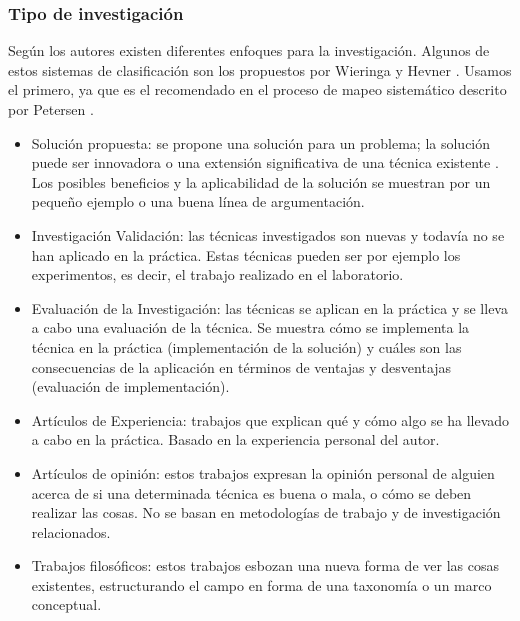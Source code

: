 \subsubsection{Tipo de investigación}
Según los autores existen diferentes enfoques para la investigación. Algunos de estos sistemas de clasificación son los propuestos por Wieringa \cite{Wieringa:2005} y Hevner \cite{Hevner:2004}. Usamos el primero, ya que es el recomendado en el proceso de mapeo sistemático descrito por Petersen \cite{Petersen:2008}.
\begin{itemize}
\item Solución propuesta: se propone una solución para un problema; la solución puede ser innovadora o una extensión significativa de una técnica existente . Los posibles beneficios y la aplicabilidad de la solución se muestran por un pequeño ejemplo o una buena línea de argumentación.
\item Investigación Validación: las técnicas investigados son nuevas y todavía no se han aplicado en la práctica. Estas técnicas pueden ser por ejemplo los experimentos, es decir, el trabajo realizado en el laboratorio.
\item Evaluación de la Investigación:  las técnicas se aplican en la práctica y se lleva a cabo una evaluación de la técnica. Se muestra cómo se implementa la técnica en la práctica (implementación de la solución) y cuáles son las consecuencias de la aplicación en términos de ventajas y desventajas (evaluación de implementación).
\item Artículos de Experiencia: trabajos que explican qué y cómo algo se ha llevado a cabo en la práctica. Basado en la experiencia personal del autor.
\item Artículos de opinión: estos trabajos expresan la opinión personal de alguien acerca de si una determinada técnica es buena o mala, o cómo se deben realizar las cosas. No se basan en metodologías de trabajo y de investigación relacionados.
\item Trabajos filosóficos: estos trabajos esbozan una nueva forma de ver las cosas existentes, estructurando el campo en forma de una taxonomía o un marco conceptual.
\end{itemize}



